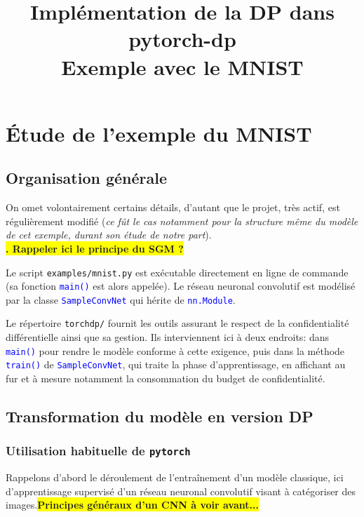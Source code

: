 \documentclass[a4paper,11pt]{article} %
\title{\textbf{Implémentation de la DP dans pytorch-dp\\{\small Exemple avec le MNIST}}}
\author{}
\date{}
\newcommand{\ttt}[1]{\texttt{#1}}
\newcommand{\file}[1]{\colorbox{blue!10}{\texttt{#1}}}
\newcommand{\code}[1]{\textcolor{blue}{\texttt{#1}}}
\newcommand{\rem}[1]{\colorbox{yellow}{\textbf{#1}}}
\newcommand{\REM}[1]{\colorbox{yellow}{\color{red}\textbf{#1}}}
\begin{document}
\maketitle
\tableofcontents
\section{Étude de l'exemple du MNIST}
%
\subsection{Organisation générale}
%
On omet volontairement certains détails, d'autant que le projet, très actif, est régulièrement modifié (\emph{ce fût le cas notamment pour la structure même du modèle de cet exemple, durant son étude de notre part}).
\\\rem{. Rappeler ici le principe du SGM ?}

Le script \file{examples/mnist.py} est exécutable directement en ligne de commande (sa fonction \code{main()} est alors appelée). Le réseau neuronal convolutif est modélisé par la classe \code{SampleConvNet} qui hérite de \code{nn.Module}.

Le répertoire \file{torchdp/} fournit les outils assurant le respect de la confidentialité différentielle ainsi que sa gestion. Ils interviennent ici à deux endroits: dans \code{main()} pour rendre le modèle conforme à cette exigence, puis dans la méthode \code{train()} de \code{SampleConvNet}, qui traite la phase d'apprentissage, en affichant au fur et à mesure notamment la consommation du \og budget de confidentialité\fg{}.
%
\subsection{Transformation du modèle en version DP}
%
\subsubsection{Utilisation habituelle de \ttt{pytorch}}
%
Rappelons d'abord le déroulement de l'entraînement d'un modèle classique, ici d'apprentissage supervisé d'un réseau neuronal convolutif visant à catégoriser des images.\REM{Principes généraux d'un CNN à voir avant...}
\end{document}
